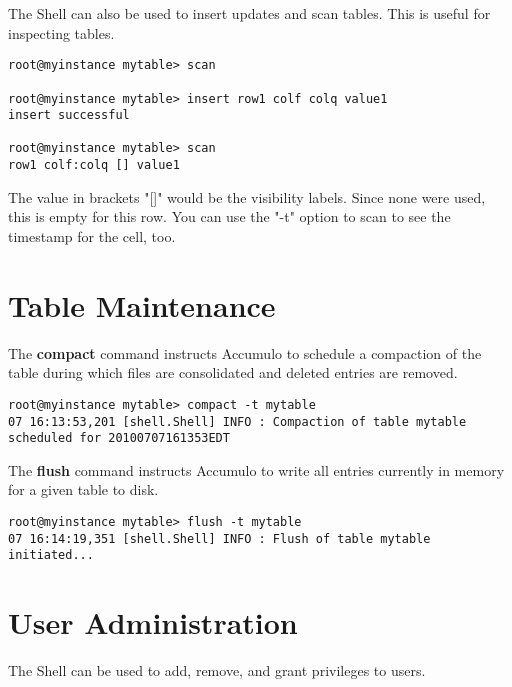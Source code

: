 The Shell can also be used to insert updates and scan tables. This is useful for
inspecting tables.

\small
\begin{verbatim}
root@myinstance mytable> scan

root@myinstance mytable> insert row1 colf colq value1
insert successful

root@myinstance mytable> scan
row1 colf:colq [] value1
\end{verbatim}
\normalsize

The value in brackets "[]" would be the visibility labels.  Since none were used, this is empty for this row.
You can use the "-t" option to scan to see the timestamp for the cell, too.

\section{Table Maintenance}

The \textbf{compact} command instructs Accumulo to schedule a compaction of the table during which
files are consolidated and deleted entries are removed.

\small
\begin{verbatim}
root@myinstance mytable> compact -t mytable
07 16:13:53,201 [shell.Shell] INFO : Compaction of table mytable
scheduled for 20100707161353EDT
\end{verbatim}
\normalsize

The \textbf{flush} command instructs Accumulo to write all entries currently in memory for a given table
to disk.

\small
\begin{verbatim}
root@myinstance mytable> flush -t mytable
07 16:14:19,351 [shell.Shell] INFO : Flush of table mytable
initiated...
\end{verbatim}
\normalsize

\section{User Administration}

The Shell can be used to add, remove, and grant privileges to users.

